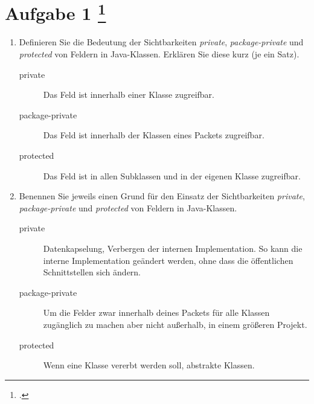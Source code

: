 \documentclass{lehramt-informatik-aufgabe}
\begin{document}
\section{Aufgabe 1
\footcite{66116:2021:03}}

\begin{enumerate}


\item Definieren Sie die Bedeutung der Sichtbarkeiten \emph{private},
\emph{package-private} und \emph{protected} von Feldern in Java-Klassen.
Erklären Sie diese kurz (je ein Satz).

\begin{liAntwort}
\begin{description}
\item[private]
Das Feld ist innerhalb einer Klasse zugreifbar.

\item[package-private]
Das Feld ist innerhalb der Klassen eines Packets zugreifbar.

\item[protected]
Das Feld ist in allen Subklassen und in der eigenen Klasse zugreifbar.

\end{description}
\end{liAntwort}


\item Benennen Sie jeweils einen Grund für den Einsatz der
Sichtbarkeiten \emph{private}, \emph{package-private} und
\emph{protected} von Feldern in Java-Klassen.

\begin{liAntwort}
\begin{description}
\item[private]

Datenkapselung, Verbergen der internen Implementation. So kann die
interne Implementation geändert werden, ohne dass die öffentlichen
Schnittstellen sich ändern.

\item[package-private]

Um die Felder zwar innerhalb deines Packets für alle Klassen zugänglich
zu machen aber nicht außerhalb, \zB in einem größeren Projekt.

\item[protected]

Wenn eine Klasse vererbt werden soll, \zB abstrakte Klassen.

\end{description}
\end{liAntwort}

\end{enumerate}
\end{document}
